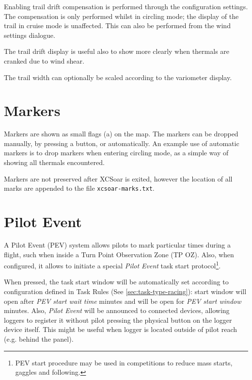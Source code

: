 Enabling trail drift compensation is performed through the
configuration settings.  The compensation is only performed
whilst in circling mode; the display of the trail in cruise mode is unaffected.
This can also be performed from the wind settings dialogue.

The trail drift display is useful also to show more clearly when thermals
are cranked due to wind shear.

The trail width can optionally be scaled according to the variometer display.


\section{Markers}\label{sec:markers}

Markers are shown as small flags (a) on the map.  The markers can be dropped
manually, by pressing a button, or automatically.  An example use of
automatic markers is to drop markers when entering circling mode, as a
simple way of showing all thermals encountered.

Markers are not preserved after XCSoar is exited, however the location
of all marks are appended to the file \verb|xcsoar-marks.txt|.

\section{Pilot Event}\label{sec:pilotevent}

A Pilot Event (PEV) system allows pilots to mark particular times during a
flight, such when inside a Turn Point Observation Zone (TP OZ). Also, when
configured, it allows to initiate a special \emph{Pilot Event} task start
protocol\footnote{PEV start procedure may be used in competitions to reduce
mass starts, gaggles and following.}.


When pressed, the task start window will be automatically set according to
configuration defined in Task Rules (See \ref{sec:task-type-racing}): start
window will open after \emph{PEV start wait time}  minutes
and will be open for \emph{PEV start window} minutes.  Also, \emph
{Pilot Event} will be announced to connected devices, allowing loggers to
register it without pilot pressing the physical button on the logger device
itself. This might be useful when logger is located outside of pilot reach
(e.g. behind the panel).

